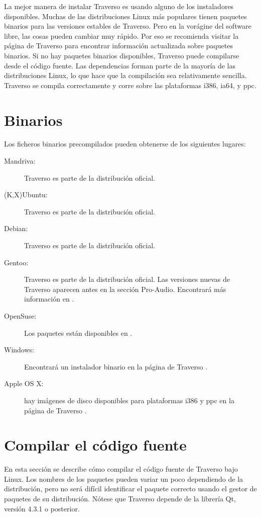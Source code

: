 ﻿La mejor manera de instalar Traverso es usando alguno de los instaladores disponibles. Muchas de las distribuciones Linux más populares tienen paquetes binarios para las versiones estables de Traverso. Pero en la vorágine del software libre, las cosas pueden cambiar muy rápido. Por eso se recomienda visitar la página de Traverso \cite{trav-hp} para encontrar información actualizada sobre paquetes binarios. Si no hay paquetes binarios disponibles, Traverso puede compilarse desde el código fuente. Las dependencias forman parte de la mayoría de las distribuciones Linux, lo que hace que la compilación sea relativamente sencilla. Traverso se compila correctamente y corre sobre las plataformas i386, ia64, y ppc.

\section{Binarios}
Los ficheros binarios precompilados pueden obtenerse de los siguientes lugares:

\begin{description}
	\item [Mandriva:] Traverso es parte de la distribución oficial.
	\item [(K,X)Ubuntu:] Traverso es parte de la distribución oficial.
	\item [Debian:] Traverso es parte de la distribución oficial.
	\item [Gentoo:] Traverso es parte de la distribución oficial. Las versiones nuevas de Traverso aparecen antes en la sección Pro-Audio. Encontrará más información en \cite{pro-audio-wiki}.
	\item [OpenSuse:] Los paquetes están disponibles en \cite{suse-ref}.
	\item [Windows:] Encontrará un instalador binario en la página de Traverso \cite{trav-hp}.
	\item [Apple OS X:] hay imágenes de disco disponibles para plataformas i386 y ppc en la página de Traverso \cite{trav-hp}.
\end{description}

\section{Compilar el código fuente}
En esta sección se describe cómo compilar el código fuente de Traverso bajo Linux. Los nombres de los paquetes pueden variar un poco dependiendo de la distribución, pero no será difícil identificar el paquete correcto usando el gestor de paquetes de su distribución. Nótese que Traverso depende de la librería Qt, versión 4.3.1 o posterior.

